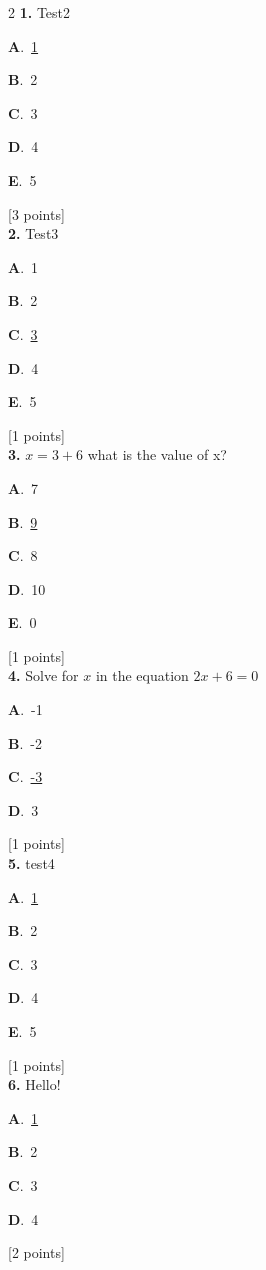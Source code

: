 \documentclass[12pt]{article}
\newcommand{\choice}[3]{%
  \noindent\textbf{#1}.~#2\hfill#3\par\vspace{0.25em}
}
\begin{document}
\begin{multicols}{2}
\noindent \textbf{\textenglish{1.}} {\textenglish{Test2}}

\noindent\choice{A}{\underline{{\textenglish{1}}}}{}
\noindent\choice{B}{{\textenglish{2}}}{}
\noindent\choice{C}{{\textenglish{3}}}{}
\noindent\choice{D}{{\textenglish{4}}}{}
\noindent\choice{E}{{\textenglish{5}}}{}
\hfill {\textenglish{[3 points]}}\\[0.5em]

\noindent \textbf{\textenglish{2.}} {\textenglish{Test3}}

\noindent\choice{A}{{\textenglish{1}}}{}
\noindent\choice{B}{{\textenglish{2}}}{}
\noindent\choice{C}{\underline{{\textenglish{3}}}}{}
\noindent\choice{D}{{\textenglish{4}}}{}
\noindent\choice{E}{{\textenglish{5}}}{}
\hfill {\textenglish{[1 points]}}\\[0.5em]

\noindent \textbf{\textenglish{3.}} \(x=3+6 \){\textenglish{ what is the value of x?}}

\noindent\choice{A}{{\textenglish{7}}}{}
\noindent\choice{B}{\underline{{\textenglish{9}}}}{}
\noindent\choice{C}{{\textenglish{8}}}{}
\noindent\choice{D}{{\textenglish{10}}}{}
\noindent\choice{E}{{\textenglish{0}}}{}
\hfill {\textenglish{[1 points]}}\\[0.5em]

\noindent \textbf{\textenglish{4.}} {\textenglish{Solve for }}\(x \){\textenglish{ in the equation }}\(2x+6 = 0 \)

\noindent\choice{A}{{\textenglish{-1}}}{}
\noindent\choice{B}{{\textenglish{-2}}}{}
\noindent\choice{C}{\underline{{\textenglish{-3}}}}{}
\noindent\choice{D}{{\textenglish{3}}}{}
\hfill {\textenglish{[1 points]}}\\[0.5em]

\noindent \textbf{\textenglish{5.}} {\textenglish{test4}}

\noindent\choice{A}{\underline{{\textenglish{1}}}}{}
\noindent\choice{B}{{\textenglish{2}}}{}
\noindent\choice{C}{{\textenglish{3}}}{}
\noindent\choice{D}{{\textenglish{4}}}{}
\noindent\choice{E}{{\textenglish{5}}}{}
\hfill {\textenglish{[1 points]}}\\[0.5em]

\noindent \textbf{\textenglish{6.}} {\textenglish{Hello!}}

\noindent\choice{A}{\underline{{\textenglish{1}}}}{}
\noindent\choice{B}{{\textenglish{2}}}{}
\noindent\choice{C}{{\textenglish{3}}}{}
\noindent\choice{D}{{\textenglish{4}}}{}
\hfill {\textenglish{[2 points]}}\\[0.5em]


\end{multicols}
\end{document}
